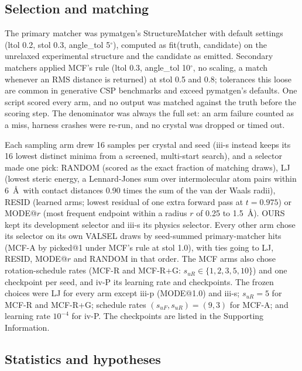\subsection{Selection and matching}

The primary matcher was pymatgen's StructureMatcher\cite{ong2013pymatgen} with
default settings (ltol 0.2, stol 0.3, angle\_tol 5$^\circ$), computed as
fit(truth, candidate) on the unrelaxed experimental structure and the candidate as
emitted. Secondary matchers applied MCF's rule\cite{zeng2026molcrystalflow} (ltol 0.3,
angle\_tol 10$^\circ$, no scaling, a match whenever an RMS distance is returned) at stol 0.5
and 0.8; tolerances this loose are common in generative CSP benchmarks and exceed
pymatgen's defaults\cite{martirossyan2025matching}. One script scored every arm, and no output
was matched against the truth before the scoring step. The denominator was always
the full set: an arm failure counted as a miss, harness crashes were re-run, and
no crystal was dropped or timed out.

Each sampling arm drew 16 samples per crystal and seed (iii-s instead keeps its 16 lowest
distinct minima from a screened, multi-start search), and a selector made one
pick: RANDOM (scored as the exact fraction of matching draws), LJ (lowest steric
energy, a Lennard-Jones sum over intermolecular atom pairs within 6~\AA\ with
contact distances 0.90 times the sum of the van der Waals radii), RESID (learned
arms; lowest residual of one extra forward pass at $t=0.975$) or MODE@$r$ (most
frequent endpoint within a radius $r$ of 0.25 to 1.5~\AA). OURS kept its
development selector and iii-s its physics selector. Every other arm chose its
selector on its own VALSEL draws by seed-summed primary-matcher hits (MCF-A by
picked@1 under MCF's rule at stol 1.0), with ties going to LJ, RESID, MODE@$r$ and
RANDOM in that order. The MCF arms also chose rotation-schedule rates (MCF-R and
MCF-R+G: $s_{uR}\in\{1,2,3,5,10\}$) and one checkpoint per seed, and iv-P its
learning rate and checkpoints. The frozen choices were LJ for every arm except
iii-p (MODE@1.0) and iii-s; $s_{uR}=5$ for MCF-R and MCF-R+G; schedule rates
$(s_{uF},s_{uR})=(9,3)$ for MCF-A; and learning rate $10^{-4}$ for iv-P. The
checkpoints are listed in the Supporting Information.

\subsection{Statistics and hypotheses}

